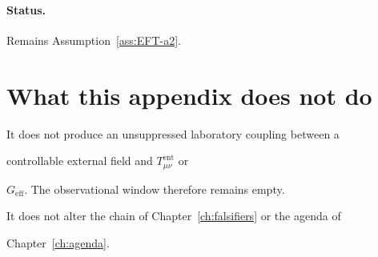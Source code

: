 \paragraph{Status.}

Remains Assumption~\ref{ass:EFT-a2}.



\section{What this appendix does not do}

\label{sec:status-not}



It does not produce an unsuppressed laboratory coupling between a

controllable external field and \(T_{\mu\nu}^{\mathrm{ent}}\) or

\(G_{\mathrm{eff}}\). The observational window therefore remains empty.

It does not alter the chain of Chapter~\ref{ch:falsifiers} or the agenda of

Chapter~\ref{ch:agenda}.